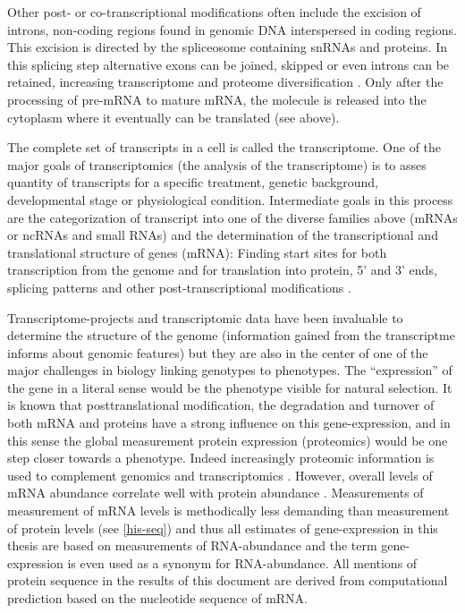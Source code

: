 Other post- or co-transcriptional modifications often include the
excision of introns, non-coding regions found in genomic DNA
interspersed in coding regions. This excision is directed by the
spliceosome containing snRNAs and proteins. In this splicing step
alternative exons can be joined, skipped or even introns can be
retained, increasing transcriptome and proteome diversification
\cite{pmid17158149}. Only after the processing of pre-mRNA to mature
mRNA, the molecule is released into the cytoplasm where it eventually
can be translated (see above).

The complete set of transcripts in a cell is called the
transcriptome. One of the major goals of transcriptomics (the analysis
of the transcriptome) is to asses quantity of transcripts for a
specific treatment, genetic background, developmental stage or
physiological condition. Intermediate goals in this process are the
categorization of transcript into one of the diverse families above
(mRNAs or ncRNAs and small RNAs) and the determination of the
transcriptional and translational structure of genes (mRNA): Finding
start sites for both transcription from the genome and for translation
into protein, 5' and 3' ends, splicing patterns and other
post-transcriptional modifications \cite{pmid19015660}.

Transcriptome-projects and transcriptomic data have been invaluable to
determine the structure of the genome (information gained from the
transcriptme informs about genomic features) but they are also in the
center of one of the major challenges in biology linking genotypes to
phenotypes. The ``expression'' of the gene in a literal sense would be
the phenotype visible for natural selection. It is known that
posttranslational modification, the degradation and turnover of both
mRNA and proteins have a strong influence on this gene-expression, and
in this sense the global measurement protein expression (proteomics)
would be one step closer towards a phenotype. Indeed increasingly
proteomic information is used to complement genomics and
transcriptomics \cite{pmid20121477}. However, overall levels of mRNA
abundance correlate well with protein abundance
\cite{pmid21593866}. Measurements of measurement of mRNA levels is
methodically less demanding than measurement of protein levels (see
\ref{his-seq}) and thus all estimates of gene-expression in this
thesis are based on measurements of RNA-abundance and the term
gene-expression is even used as a synonym for RNA-abundance. All
mentions of protein sequence in the results of this document are
derived from computational prediction based on the nucleotide sequence
of mRNA.

